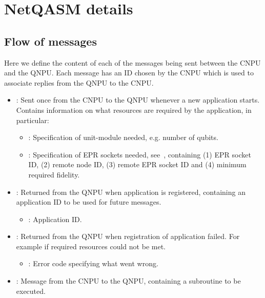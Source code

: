 \chapter{NetQASM details}
\label{app:netqasm}


\section{Flow of messages}
\label{netqasm:sec:app-messages}
Here we define the content of each of the messages being sent between the \ac{CNPU} and the \ac{QNPU}.
Each message has an ID chosen by the \ac{CNPU} which is used to associate replies from the \ac{QNPU} to the \ac{CNPU}.
\begin{itemize}
  \item {}:
        Sent once from the \ac{CNPU} to the \ac{QNPU} whenever a new application starts.
        Contains information on what resources are required by the application, in particular:
        \begin{itemize}
            \item {}: Specification of unit-module needed, e.g. number of qubits.
            \item {}: Specification of EPR sockets needed, see~\cite{kozlowski2020networklayer}, containing
                (1) EPR socket ID,
                (2) remote node ID,
                (3) remote EPR socket ID and
                (4) minimum required fidelity.
        \end{itemize}
  \item {}:
            Returned from the \ac{QNPU} when application is registered, containing an application ID to be used for future messages.
            \begin{itemize}
                \item {}: Application ID.
            \end{itemize}
  \item {}:
        Returned from the \ac{QNPU} when registration of application failed.
        For example if required resources could not be met.
        \begin{itemize}
            \item {}: Error code specifying what went wrong.
        \end{itemize}
  \item {}:
        Message from the \ac{CNPU} to the \ac{QNPU}, containing a subroutine to be executed.

\end{itemize}
